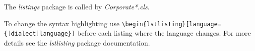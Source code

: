 The \emph{listings} package is called by \emph{Corporate*.cls}.

To change the syntax highlighting use \verb+\begin{lstlisting}[language={[dialect]language}]+ before each listing where the language changes. For more details see the \emph{lstlisting} package documentation.
